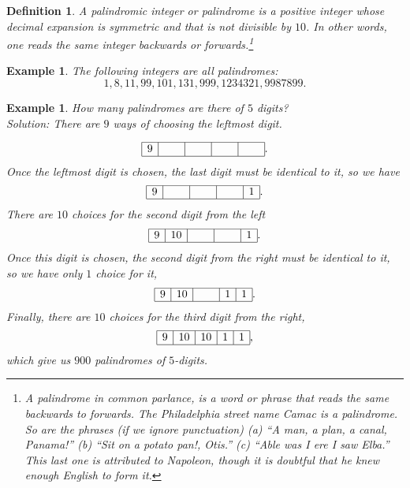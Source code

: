 \documentclass[11pt, openany]{book}
\theoremstyle{change} \theoremheaderfont{\blue\sffamily\bfseries}
\newtheorem{exa}[thm]{Example}
\newtheorem{df}[thm]{Definition}
\theoremstyle{nonumberplain} \theoremheaderfont{\sffamily\bfseries}
\newcommand{\í}{\'{\i}}
\begin{document}
\begin{df}
A {\em palindromic integer} or {\em palindrome} is a positive
integer whose decimal expansion is symmetric and that is not
divisible by $10$. In other words, one reads the same integer
backwards or forwards.\footnote{A palindrome in common parlance, is
a word or phrase that reads the same backwards to forwards. The
Philadelphia street name {\em Camac} is a palindrome. So are the
phrases (if we ignore punctuation) (a) ``A man, a plan, a canal,
Panama!'' (b) ``Sit on a potato pan!, Otis.'' (c) ``Able was I ere I
saw Elba.'' This last one is attributed to Napoleon, though it is
doubtful that he knew enough English to form it. }
\end{df}
\begin{exa}
The following integers are all palindromes:
$$ 1,8, 11, 99, 101, 131, 999, 1234321, 9987899.         $$
\end{exa}
\begin{exa}\label{exa:5digit_palindromes}
How many palindromes  are there of $5$ digits? \\
Solution: There are $9$ ways of choosing the leftmost digit.

$$\begin{array}{|c|c|c|c|c|}\hline 9 & \hspace{.5cm} & \hspace{.5cm} & \hspace{.5cm} & \hspace{.5cm}  \\ \hline \end{array}.  $$
Once the leftmost digit is chosen, the last digit must be identical
to it, so we have
$$\begin{array}{|c|c|c|c|c|}\hline 9 & \hspace{.5cm} & \hspace{.5cm} & \hspace{.5cm} & 1  \\ \hline \end{array} . $$
There are $10$ choices for the second digit from the left
$$\begin{array}{|c|c|c|c|c|}\hline 9 & 10 & \hspace{.5cm} & \hspace{.5cm} & 1  \\ \hline \end{array} . $$
Once this digit is chosen, the second digit from the right must be
identical to it, so we have only $1$ choice for it,
$$\begin{array}{|c|c|c|c|c|}\hline 9 & 10 & \hspace{.5cm} & 1 & 1  \\ \hline \end{array} . $$
Finally, there are $10$ choices for the third digit from the right,
$$\begin{array}{|c|c|c|c|c|}\hline 9 & 10 & 10 & 1 & 1  \\ \hline \end{array}, $$
which give us $900$ palindromes of $5$-digits.
\end{exa}
\end{document}
